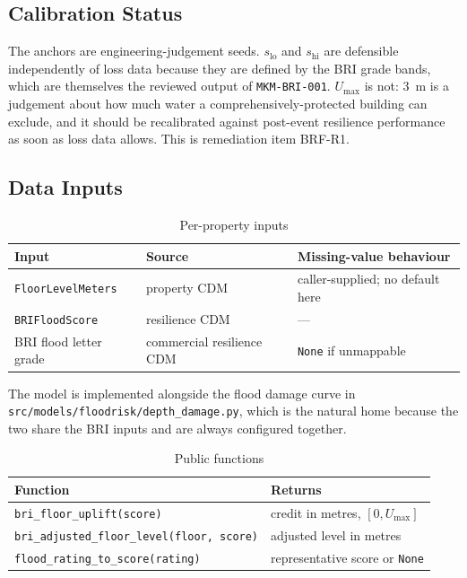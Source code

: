 \documentclass[11pt,a4paper]{article}
\begin{document}
\subsection{Calibration Status}
The anchors are engineering-judgement seeds. $s_{\text{lo}}$ and $s_{\text{hi}}$
are defensible independently of loss data because they are defined by the BRI
grade bands, which are themselves the reviewed output of \texttt{MKM-BRI-001}.
$U_{\max}$ is not: 3~m is a judgement about how much water a
comprehensively-protected building can exclude, and it should be recalibrated
against post-event resilience performance as soon as loss data allows. This is
remediation item BRF-R1.

\subsection{Data Inputs}

\begin{table}[H]
  \centering
  \caption{Per-property inputs}
  \begin{tabular}{lll}
    \toprule
    \textbf{Input} & \textbf{Source} & \textbf{Missing-value behaviour} \\
    \midrule
    \texttt{FloorLevelMeters} & property CDM & caller-supplied; no default here \\
    \texttt{BRIFloodScore} & resilience CDM & --- \\
    BRI flood letter grade & commercial resilience CDM & \texttt{None} if unmappable \\
    \bottomrule
  \end{tabular}
\end{table}

\mkmimplementation

The model is implemented alongside the flood damage curve in
\texttt{src/models/floodrisk/depth\_damage.py}, which is the natural home
because the two share the BRI inputs and are always configured together.

\begin{table}[H]
  \centering
  \caption{Public functions}
  \begin{tabular}{ll}
    \toprule
    \textbf{Function} & \textbf{Returns} \\
    \midrule
    \texttt{bri\_floor\_uplift(score)} & credit in metres, $[0, U_{\max}]$ \\
    \texttt{bri\_adjusted\_floor\_level(floor, score)} & adjusted level in metres \\
    \texttt{flood\_rating\_to\_score(rating)} & representative score or \texttt{None} \\
    \bottomrule
  \end{tabular}
\end{table}
\end{document}
